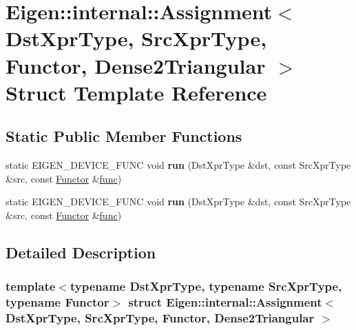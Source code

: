\hypertarget{struct_eigen_1_1internal_1_1_assignment_3_01_dst_xpr_type_00_01_src_xpr_type_00_01_functor_00_01_dense2_triangular_01_4}{}\section{Eigen\+:\+:internal\+:\+:Assignment$<$ Dst\+Xpr\+Type, Src\+Xpr\+Type, Functor, Dense2\+Triangular $>$ Struct Template Reference}
\label{struct_eigen_1_1internal_1_1_assignment_3_01_dst_xpr_type_00_01_src_xpr_type_00_01_functor_00_01_dense2_triangular_01_4}
\subsection*{Static Public Member Functions}
\begin{DoxyCompactItemize}
\item 
\mbox{\label{struct_eigen_1_1internal_1_1_assignment_3_01_dst_xpr_type_00_01_src_xpr_type_00_01_functor_00_01_dense2_triangular_01_4_a29c908c10a930f070f1c187eda70e46d}} 
static E\+I\+G\+E\+N\+\_\+\+D\+E\+V\+I\+C\+E\+\_\+\+F\+U\+NC void {\bfseries run} (Dst\+Xpr\+Type \&dst, const Src\+Xpr\+Type \&src, const \hyperlink{struct_functor}{Functor} \&\hyperlink{structfunc}{func})
\item 
\mbox{\label{struct_eigen_1_1internal_1_1_assignment_3_01_dst_xpr_type_00_01_src_xpr_type_00_01_functor_00_01_dense2_triangular_01_4_a29c908c10a930f070f1c187eda70e46d}} 
static E\+I\+G\+E\+N\+\_\+\+D\+E\+V\+I\+C\+E\+\_\+\+F\+U\+NC void {\bfseries run} (Dst\+Xpr\+Type \&dst, const Src\+Xpr\+Type \&src, const \hyperlink{struct_functor}{Functor} \&\hyperlink{structfunc}{func})
\end{DoxyCompactItemize}


\subsection{Detailed Description}
\subsubsection*{template$<$typename Dst\+Xpr\+Type, typename Src\+Xpr\+Type, typename Functor$>$\newline
struct Eigen\+::internal\+::\+Assignment$<$ Dst\+Xpr\+Type, Src\+Xpr\+Type, Functor, Dense2\+Triangular $>$}



